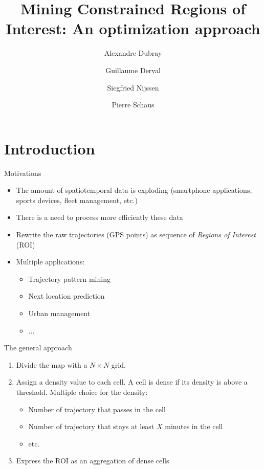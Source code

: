 \documentclass[10pt]{beamer}
\title{Mining Constrained Regions of Interest: An optimization approach}
\date{}
\author{Alexandre Dubray \and Guillaume Derval \and Siegfried Nijssen \and Pierre Schaus}
\institute{}
\begin{document}
\maketitle


\section{Introduction}

\begin{frame}{Motivations}
\begin{itemize}
    \item The amount of spatiotemporal data is exploding (smartphone applications, sports devices, fleet management, etc.)
    \item There is a need to process more efficiently these data
    \item Rewrite the raw trajectories (GPS points) as sequence of \emph{Regions of Interest} (ROI)
    \item Multiple applications:
        \begin{itemize}
            \item Trajectory pattern mining
            \item Next location prediction
            \item Urban management
            \item ...
        \end{itemize}
\end{itemize}
\end{frame}

\begin{frame}{The general approach}
    \begin{enumerate}
        \item Divide the map with a $N \times N$ grid.
        \item Assign a density value to each cell. A cell is dense if its density is above a threshold. Multiple choice for the density:
            \begin{itemize}
                \item Number of trajectory that passes in the cell
                \item Number of trajectory that stays at least $X$ minutes in the cell
                \item etc.
            \end{itemize}
        \item Express the ROI as an aggregation of dense cells
    \end{enumerate}
\end{frame}
\end{document}

